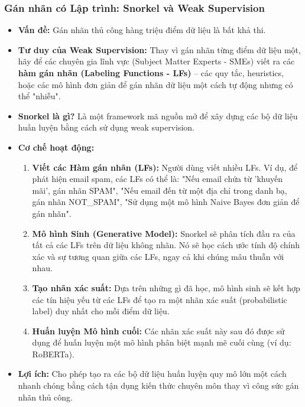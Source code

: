 \subsubsection{Gán nhãn có Lập trình: Snorkel và Weak Supervision}
\begin{itemize}
    \item \textbf{Vấn đề:} Gán nhãn thủ công hàng triệu điểm dữ liệu là bất khả thi.
    \item \textbf{Tư duy của Weak Supervision:} Thay vì gán nhãn từng điểm dữ liệu một, hãy để các chuyên gia lĩnh vực (Subject Matter Experts - SMEs) viết ra các \textbf{hàm gán nhãn (Labeling Functions - LFs)} -- các quy tắc, heuristics, hoặc các mô hình đơn giản để gán nhãn dữ liệu một cách tự động nhưng có thể "nhiễu".
    \item \textbf{Snorkel là gì?} Là một framework mã nguồn mở để xây dựng các bộ dữ liệu huấn luyện bằng cách sử dụng weak supervision.
    \item \textbf{Cơ chế hoạt động:}
        \begin{enumerate}
            \item \textbf{Viết các Hàm gán nhãn (LFs):} Người dùng viết nhiều LFs. Ví dụ, để phát hiện email spam, các LFs có thể là: "Nếu email chứa từ 'khuyến mãi', gán nhãn SPAM", "Nếu email đến từ một địa chỉ trong danh bạ, gán nhãn NOT\_SPAM", "Sử dụng một mô hình Naive Bayes đơn giản để gán nhãn".
            \item \textbf{Mô hình Sinh (Generative Model):} Snorkel sẽ phân tích đầu ra của tất cả các LFs trên dữ liệu không nhãn. Nó sẽ học cách ước tính độ chính xác và sự tương quan giữa các LFs, ngay cả khi chúng mâu thuẫn với nhau.
            \item \textbf{Tạo nhãn xác suất:} Dựa trên những gì đã học, mô hình sinh sẽ kết hợp các tín hiệu yếu từ các LFs để tạo ra một nhãn xác suất (probabilistic label) duy nhất cho mỗi điểm dữ liệu.
            \item \textbf{Huấn luyện Mô hình cuối:} Các nhãn xác suất này sau đó được sử dụng để huấn luyện một mô hình phân biệt mạnh mẽ cuối cùng (ví dụ: RoBERTa).
        \end{enumerate}
    \item \textbf{Lợi ích:} Cho phép tạo ra các bộ dữ liệu huấn luyện quy mô lớn một cách nhanh chóng bằng cách tận dụng kiến thức chuyên môn thay vì công sức gán nhãn thủ công.
\end{itemize}

